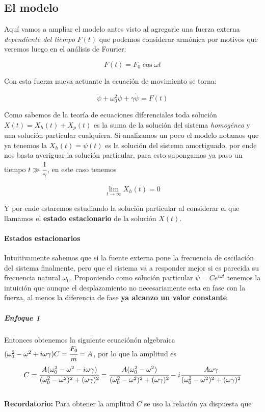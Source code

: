 \documentclass[a4paper,spanish]{article}
\numberwithin{equation}{section}
\begin{document}
\subsection{El modelo}
Aqu\'i vamos a ampliar el modelo antes visto al agregarle una fuerza externa \textit{dependiente del tiempo} $F(t)$ que podemos considerar arm\'onica por motivos que veremos luego en el an\'alisis de Fourier:

\[ F(t)= F_0 \cos{\omega t} \]

Con esta fuerza nueva actuante la ecuaci\'on de movimiento se torna:

    \begin{equation}
        \ddot{\psi} + \omega_0 ^2 \psi + \gamma \dot{\psi} = F(t)
        \label{eq:oscilador_forzado}
    \end{equation}
    
Como sabemos de la teor\'ia de ecuaciones diferenciales toda soluci\'on $X(t)=X_h(t)+X_p(t)$ es la suma de la soluci\'on del sistema \textit{homog\'eneo} y una soluci\'on particular cualquiera. Si analizamos un poco el modelo notamos que ya tenemos la $X_h(t)=\psi(t)$ es la soluci\'on del sistema amortiguado, por ende nos basta averiguar la soluci\'on particular, para esto supongamos ya paso un tiempo $t\gg\cfrac{1}{\gamma}$, en este caso tenemos 
    
\[\lim_{t\rightarrow\infty} X_h(t)=0\]

Y por ende estaremos estudiando la soluci\'on particular al considerar el que llamamos el \textbf{estado estacionario} de la soluci\'on $X(t)$.

\paragraph{Estados estacionarios}

Intuitivamente sabemos que si la fuente externa pone la frecuencia de oscilaci\'on del sistema finalmente, pero que el sistema va a responder mejor si es parecida su frecuencia natural $\omega_0$. Proponiendo como soluci\'on particular $\psi = C e^{i \omega t}$ tenemos la intuici\'on que aunque el desplazamiento no necesariamente esta en fase con la fuerza, al menos la diferencia de fase \textbf{ya alcanzo un valor constante}. 

\subparagraph*{Enfoque 1}

Entonces obtenemos la siguiente ecuaci\'on\'on algebraica $(\omega_0^2 - \omega^2 + i \omega \gamma) C = \cfrac{F_0}{m}=A$, por lo que la amplitud es
	\begin{equation}
		C = \cfrac{A (\omega_0^2 - \omega^2 - i \omega \gamma)}{(\omega_0^2 - \omega^2)^2 + (\omega \gamma)^2} = \cfrac{A (\omega_0^2 - \omega^2)}{(\omega_0^2 - \omega^2)^2 + (\omega \gamma)^2} - i \cfrac{A \omega \gamma}{(\omega_0^2 - \omega^2)^2 + (\omega \gamma)^2}
		\label{eq:oscilador_forzado_particular_amplitud}
	\end{equation}
\\
\textbf{Recordatorio:} Para obtener la amplitud $C$ se uso la relaci\'on ya dispuesta que
\end{document}
